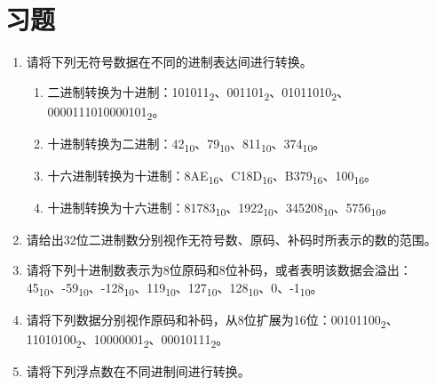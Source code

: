 \documentclass[]{ctexbook}
\providecommand{\tightlist}{%
  \setlength{\itemsep}{0pt}\setlength{\parskip}{0pt}}
\begin{document}
\hypertarget{ux4e60ux9898-7}{%
\section{习题}\label{ux4e60ux9898-7}}

\begin{enumerate}
\def\labelenumi{\arabic{enumi}.}
\item
  请将下列无符号数据在不同的进制表达间进行转换。

  \begin{enumerate}
  \def\labelenumii{\alph{enumii})}
  \tightlist
  \item
    二进制转换为十进制：101011\textsubscript{2}、001101\textsubscript{2}、01011010\textsubscript{2}、0000111010000101\textsubscript{2}。
  \item
    十进制转换为二进制：42\textsubscript{10}、79\textsubscript{10}、811\textsubscript{10}、374\textsubscript{10}。
  \item
    十六进制转换为十进制：8AE\textsubscript{16}、C18D\textsubscript{16}、B379\textsubscript{16}、100\textsubscript{16}。
  \item
    十进制转换为十六进制：81783\textsubscript{10}、1922\textsubscript{10}、345208\textsubscript{10}、5756\textsubscript{10}。
  \end{enumerate}
\item
  请给出32位二进制数分别视作无符号数、原码、补码时所表示的数的范围。
\item
  请将下列十进制数表示为8位原码和8位补码，或者表明该数据会溢出：45\textsubscript{10}、-59\textsubscript{10}、-128\textsubscript{10}、119\textsubscript{10}、127\textsubscript{10}、128\textsubscript{10}、0、-1\textsubscript{10}。
\item
  请将下列数据分别视作原码和补码，从8位扩展为16位：00101100\textsubscript{2}、11010100\textsubscript{2}、10000001\textsubscript{2}、00010111\textsubscript{2}。
\item
  请将下列浮点数在不同进制间进行转换。


\end{enumerate}
\end{document}
